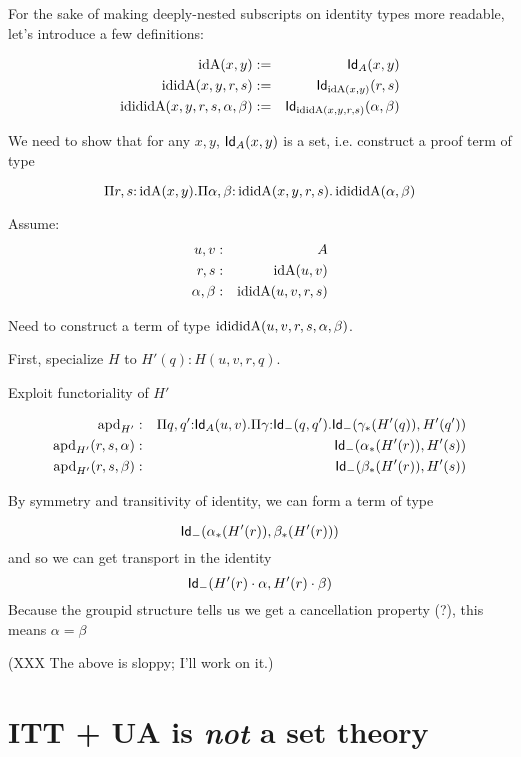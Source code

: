\documentclass[11pt]{article}
\begin{document}
For the sake of making deeply-nested subscripts on identity types more
readable, let's introduce a few definitions:

\newcommand{\idA}{\op{idA}}
\newcommand{\ididA}{\op{ididA}}
\newcommand{\idididA}{\op{idididA}}
\begin{eqnarray*}
\op{idA}(x,y) &:=& \Id{A}(x,y)\\
\op{ididA}(x,y,r,s) &:=& \Id{\idA(x,y)}(r,s) \\
\op{idididA}(x,y,r,s,\alpha,\beta) &:=& \Id{\ididA(x,y,r,s)}(\alpha,\beta)
\end{eqnarray*}

We need to show that for any $x,y$, 
$\mathsf{Id}_{A}(x,y)$ is a set, i.e. construct a proof term of type

\[
\Pi{r,s}{:}\idA(x,y).\Pi{\alpha,\beta}{:}\ididA(x,y,r,s).
\idididA(\alpha,\beta)
\]

Assume:
\begin{eqnarray*}
u,v &:& A\\
r,s &:& \idA(u,v)\\
\alpha,\beta &:& \ididA(u,v,r,s)
\end{eqnarray*}

Need to construct a term of type $\idididA(u,v,r,s,\alpha,\beta)$.

First, specialize $H$ to $H'(q) : H(u,v,r,q)$.

Exploit functoriality of $H'$

\begin{eqnarray*}
\operatorname{apd}_{H'} &:& \Pi{q,q'}{:}\mathsf{Id}_{A}(u,v).
                \Pi{\gamma}{:}\mathsf{Id}_{-}(q,q').
                  \mathsf{Id}_{-}(\gamma_{*}(H'(q)), H'(q'))\\
\operatorname{apd}_{H'}(r,s,\alpha) &:& \mathsf{Id}_{-}(\alpha_{*}(H'(r)), H'(s))\\
\operatorname{apd}_{H'}(r,s,\beta) &:& \mathsf{Id}_{-}(\beta_*{}(H'(r)), H'(s))
\end{eqnarray*}

By symmetry and transitivity of identity, we can form a term of type

\[
\mathsf{Id}_{-}(\alpha_*(H'(r)), \beta_*(H'(r)))
\]
and so we can get transport in the identity
\[
\mathsf{Id}_{-}(H'(r)\cdot \alpha, H'(r)\cdot\beta)
\]
Because the groupid structure tells us we get a cancellation property (?),
this means $\alpha = \beta$

(XXX The above is sloppy; I'll work on it.)

\section{ITT + UA is {\em not} a set theory}
\end{document}
